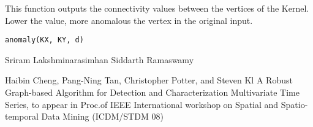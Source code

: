 \begin{Description}\relax
This function outputs the connectivity values between the vertices of the Kernel. Lower the value, more anomalous the vertex in the original input.
\end{Description}
\begin{Usage}
\begin{verbatim}
anomaly(KX, KY, d)
\end{verbatim}
\end{Usage}
\begin{Arguments}
\begin{ldescription}
\item[\code{KX}] 
\item[\code{KY}] 
\item[\code{d}] 
\end{ldescription}
\end{Arguments}
\begin{Author}\relax
Sriram Lakshminarasimhan 
Siddarth Ramaswamy
\end{Author}
\begin{References}\relax
[1] Haibin Cheng, Pang-Ning Tan, Christopher Potter, and Steven Kl
A Robust Graph-based Algorithm for Detection and Characterization 
Multivariate Time Series, to appear in Proc.of IEEE International 
workshop on Spatial and Spatio-temporal Data Mining (ICDM/STDM 08)
\end{References}


